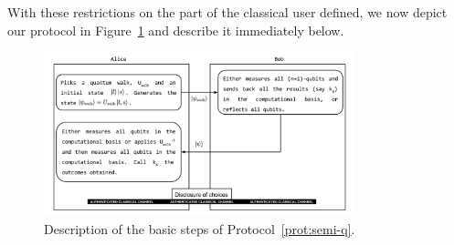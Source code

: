 With these restrictions on the part of the classical user defined, we now depict our protocol in Figure~\ref{fig:semi_QKD} and describe it immediately below.


    \begin{center}
    \begin{figure}[h!]
    \centering
    \includegraphics[width=0.8\textwidth]{semi_quantum_QKD.png}
    \caption{Description of the basic steps of Protocol~\ref{prot:semi-q}.}
    \label{fig:semi_QKD}
    \end{figure}
    \end{center}

